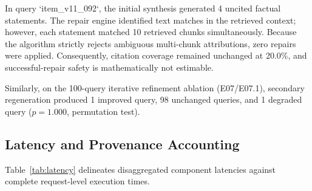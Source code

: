 \documentclass[conference]{IEEEtran}
\begin{document}
In query `item_v11_092`, the initial synthesis generated 4 uncited factual statements. The repair engine identified text matches in the retrieved context; however, each statement matched 10 retrieved chunks simultaneously. Because the algorithm strictly rejects ambiguous multi-chunk attributions, zero repairs were applied. Consequently, citation coverage remained unchanged at 20.0\%, and successful-repair safety is mathematically not estimable.

Similarly, on the 100-query iterative refinement ablation (E07/E07.1), secondary regeneration produced 1 improved query, 98 unchanged queries, and 1 degraded query ($p=1.000$, permutation test).

\subsection{Latency and Provenance Accounting}
Table~\ref{tab:latency} delineates disaggregated component latencies against complete request-level execution times.

\begin{table}[htbp]
\caption{Latency Breakdown Across Operational Boundaries}
\label{tab:latency}
\centering
{}
\end{table}
\end{document}
